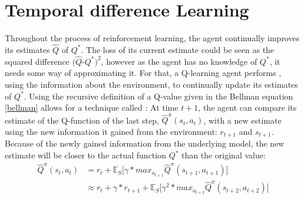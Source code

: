 \section{Temporal difference Learning}



Throughout the process of reinforcement learning, the agent continually improves its estimates $\hat{Q}$ of $Q^*$. The loss of its current estimate could be seen as the squared difference $(\hat{Q}$-$Q^*)^2$, however as the agent has no knowledge of $Q^*$, it needs some way of approximating it. For that, a Q-learning agent performs , using the information about the environment, to continually update its estimates of $Q^*$.
\noindent Using the recursive definition of a Q-value given in the Bellman equation \ref{bellman} allows for a technique called \cite{sutton1988}: At time $t+1$, the agent can compare its estimate of the Q-function of the last step, $\hat{Q}^\pi(s_t, a_t)$, with a new estimate using the new information it gained from the environment: $r_{t+1}$ and $s_{t+1}$.  Because of the newly gained information from the underlying model, the new estimate will be closer to the actual function $Q^*$ than the original value:
\begin{align} 
	\hat{Q}^\pi(s_t,a_t) &= r_t + \mathds{E}_S \big[ \gamma * max_{a_{t+1}} \hat{Q}^\pi(s_{t+1},a_{t+1})  \big]\\
	                     &\approx r_t + \gamma * r_{t+1} + \mathds{E}_S \big[ \gamma^2 * max_{a_{t+2}} \hat{Q}^\pi(s_{t+2},a_{t+2})  \big] \label{bellmanmal2}
\end{align}

